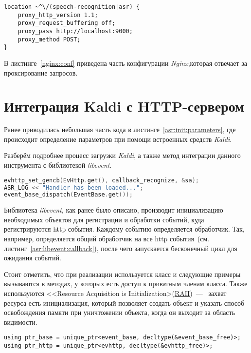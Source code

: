 \begin{lstlisting}[caption={Пример конфигурации Nginx},label={nginx:conf}]
location ~^\/(speech-recognition|asr) {
    proxy_http_version 1.1;
    proxy_request_buffering off;
    proxy_pass http://localhost:9000;
    proxy_method POST;
}

\end{lstlisting}

В листинге~\ref{nginx:conf} приведена часть конфигурации \textit{Nginx},которая
отвечает за проксирование запросов.

\section{Интеграция Kaldi с HTTP-сервером}
Ранее приводилась небольшая часть кода в листинге~\ref{asr:init:parameters}, где
происходит определение параметров при помощи встроенных средств \textit{Kaldi}.

Разберём подробнее процесс загрузки \textit{Kaldi}, а также метод интеграции
данного инструмента с библиотекой \textit{libevent}.

\begin{lstlisting}[caption={Создание обработчика событий},label=asr:libevent:callback,language=C++]
evhttp_set_gencb(EvHttp.get(), callback_recognize, &sa);
ASR_LOG << "Handler has been loaded...";
event_base_dispatch(EventBase.get());

\end{lstlisting}

Библиотека \textit{libevent}, как ранее было описано, производит инициализацию
необходимых объектов для регистрации и обработки событий, куда регистрируются
http события. Каждому событию определяется обработчик. Так, например, определяется
общий обработчик на все http события~(см. листинг~\ref{asr:libevent:callback}),
после чего запускается бесконечный цикл для ожидания событий.

Стоит отметить, что при реализации используется класс и следующие примеры вызываются
в методах, у которых есть доступ к приватным членам класса. Также используются
<<Resource Acquisition is Initialization>(\hyperlink{raii}{RAII})~---~
захват ресурса есть инициализация, который позволяет создать объект и указать
способ освобождения памяти при уничтожении объекта, когда он выходит за область
видимости.

\begin{lstlisting}[caption={Описание некоторых типов данных}, label={lst:class:types}]
using ptr_base = unique_ptr<event_base, decltype(&event_base_free)>;
using ptr_http = unique_ptr<evhttp, decltype(&evhttp_free)>;
\end{lstlisting}

